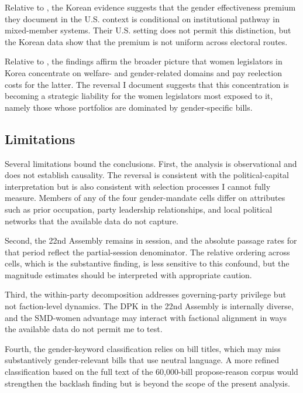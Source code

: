 \documentclass[11pt]{article}
\begin{document}
Relative to \citet{voldenWisemanWittmer2016}, the Korean evidence suggests that the gender effectiveness premium they document in the U.S. context is conditional on institutional pathway in mixed-member systems. Their U.S. setting does not permit this distinction, but the Korean data show that the premium is not uniform across electoral routes.

Relative to \citet{shim2021a, shim2021b}, the findings affirm the broader picture that women legislators in Korea concentrate on welfare- and gender-related domains and pay reelection costs for the latter. The reversal I document suggests that this concentration is becoming a strategic liability for the women legislators most exposed to it, namely those whose portfolios are dominated by gender-specific bills.

\subsection{Limitations}

Several limitations bound the conclusions. First, the analysis is observational and does not establish causality. The reversal is consistent with the political-capital interpretation but is also consistent with selection processes I cannot fully measure. Members of any of the four gender-mandate cells differ on attributes such as prior occupation, party leadership relationships, and local political networks that the available data do not capture.

Second, the 22nd Assembly remains in session, and the absolute passage rates for that period reflect the partial-session denominator. The relative ordering across cells, which is the substantive finding, is less sensitive to this confound, but the magnitude estimates should be interpreted with appropriate caution.

Third, the within-party decomposition addresses governing-party privilege but not faction-level dynamics. The DPK in the 22nd Assembly is internally diverse, and the SMD-women advantage may interact with factional alignment in ways the available data do not permit me to test.

Fourth, the gender-keyword classification relies on bill titles, which may miss substantively gender-relevant bills that use neutral language. A more refined classification based on the full text of the 60,000-bill propose-reason corpus would strengthen the backlash finding but is beyond the scope of the present analysis.
\end{document}
